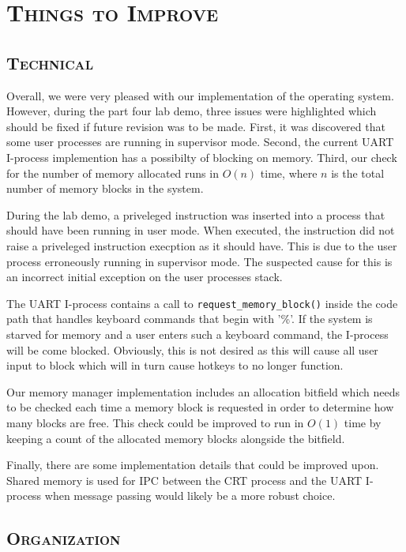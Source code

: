 \documentclass[oneside]{report}
\begin{document}
\section{\textsc{Things to Improve}}

\subsection{\textsc{Technical}}

Overall, we were very pleased with our implementation of the operating system.
However, during the part four lab demo, three issues were highlighted which
should be fixed if future revision was to be made. First, it was discovered
that some user processes are running in supervisor mode. Second, the current
UART I-process implemention has a possibilty of blocking on memory. Third, our
check for the number of memory allocated runs in $O(n)$ time, where $n$ is the
total number of memory blocks in the system.

During the lab demo, a priveleged instruction was inserted into a process that
should have been running in user mode. When executed, the instruction did not
raise a priveleged instruction execption as it should have. This is due to the
user process erroneously running in supervisor mode. The suspected cause for
this is an incorrect initial exception on the user processes stack.

The UART I-process contains a call to \texttt{request\_memory\_block()} inside
the code path that handles keyboard commands that begin with '\%'. If the
system is starved for memory and a user enters such a keyboard command, the
I-process will be come blocked. Obviously, this is not desired as this will
cause all user input to block which will in turn cause hotkeys to no longer
function.

Our memory manager implementation includes an allocation bitfield which needs
to be checked each time a memory block is requested in order to determine how
many blocks are free. This check could be improved to run in $O(1)$ time by
keeping a count of the allocated memory blocks alongside the bitfield.

Finally, there are some implementation details that could be improved upon.
Shared memory is used for IPC between the CRT process and the UART I-process
when message passing would likely be a more robust choice. 

\subsection{\textsc{Organization}}
\end{document}
